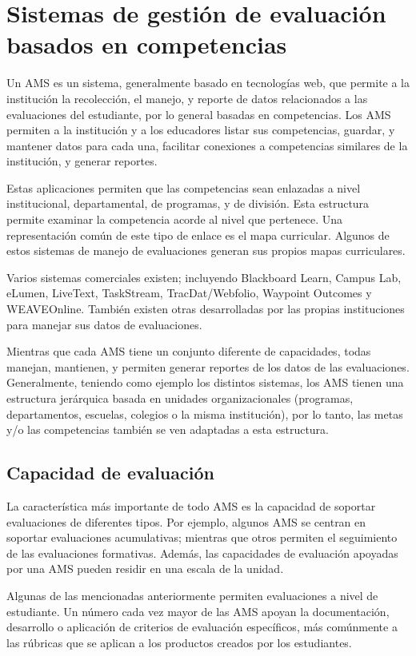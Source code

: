 \section{Sistemas de gestión de evaluación basados en competencias}
Un AMS es un sistema, generalmente basado en tecnologías web, que permite a la institución la recolección, el manejo, y reporte de datos relacionados a las evaluaciones del estudiante, por lo general basadas en competencias. Los AMS permiten a la institución y a los educadores listar sus competencias, guardar, y mantener datos para cada una, facilitar conexiones a competencias similares de la institución, y generar reportes\citep{cartwright2009student}.

Estas aplicaciones permiten que las competencias sean enlazadas a nivel institucional, departamental, de programas, y de división. Esta estructura permite examinar la competencia
acorde al nivel que pertenece. Una representación común de este tipo de enlace es el mapa curricular\citep{oakleaf_choosing_2013}. Algunos de estos sistemas de manejo de evaluaciones generan sus propios mapas curriculares.

Varios sistemas comerciales existen; incluyendo Blackboard Learn, Campus Lab, eLumen, LiveText, TaskStream, TracDat/Webfolio, Waypoint Outcomes y WEAVEOnline. También existen otras desarrolladas por las propias instituciones para manejar sus datos de evaluaciones.

Mientras que cada AMS tiene un conjunto diferente de capacidades, todas manejan, mantienen, y permiten generar reportes de los datos de las evaluaciones. Generalmente, teniendo como ejemplo los distintos sistemas, los AMS tienen una estructura jerárquica basada en unidades organizacionales (programas, departamentos, escuelas, colegios o la misma institución), por lo tanto, las metas y/o las competencias también se ven adaptadas a esta estructura.

\subsection{Capacidad de evaluación}
La característica más importante de todo AMS es la capacidad de soportar evaluaciones de diferentes tipos\citep{oakleaf_choosing_2013}. Por ejemplo, algunos AMS se centran en soportar evaluaciones acumulativas; mientras que otros permiten el seguimiento de las evaluaciones formativas. Además, las capacidades de evaluación apoyadas por una AMS pueden residir en una escala de la unidad.

Algunas de las mencionadas anteriormente permiten evaluaciones a nivel de estudiante. Un número cada vez mayor de las AMS apoyan la documentación, desarrollo o aplicación de criterios de evaluación específicos, más comúnmente a las rúbricas que se aplican a los productos creados por los estudiantes.

